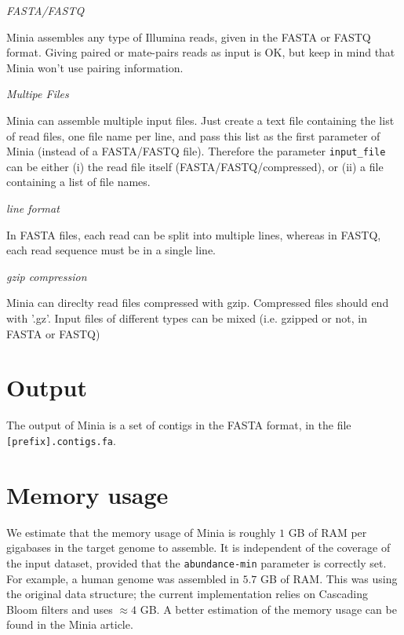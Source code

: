 \documentclass[a4paper]{article}
\begin{document}
\begin{description}
\item \emph{FASTA/FASTQ}

Minia assembles any type of Illumina reads, given in the FASTA or FASTQ format. Giving paired or mate-pairs reads as input is OK, but keep in mind that Minia won't use pairing information.
\item \emph{Multipe Files}

 Minia can assemble multiple input files. Just create a text file containing the list of read files, one file name per line, and pass this list as the first parameter of Minia (instead of a FASTA/FASTQ file). Therefore the parameter \verb+input_file+ can be either (i) the read file itself (FASTA/FASTQ/compressed), or (ii) a file containing a list of file names.
\item \emph{line format}

 In FASTA files, each read can be split into multiple lines, whereas in FASTQ, each read sequence must be in a single line.

\item \emph{gzip compression}

Minia can direclty read files compressed with gzip. Compressed files should end with '.gz'. Input files of different types can be mixed (i.e. gzipped or not, in FASTA or FASTQ)

\end{description}

\section{Output}

The output of Minia is a set of contigs in the FASTA format, in the file \verb+[prefix].contigs.fa+. 

\section{Memory usage}

We estimate that the memory usage of Minia is roughly $1$ GB of RAM per gigabases in the target genome to assemble. It is independent of the coverage of the input dataset, provided that the \verb!abundance-min! parameter is correctly set. For example, a human genome was assembled in $5.7$ GB of RAM. This was using the original data structure; the current implementation relies on Cascading Bloom filters and uses $\approx 4$ GB. A better estimation of the memory usage can be found in the Minia article.
\end{document}

